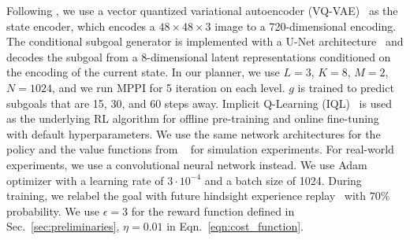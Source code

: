 Following \cite{Khazatsky2021WhatCI}, we use a vector quantized variational autoencoder (VQ-VAE)~\cite{Oord2017NeuralDR} as the state encoder, which encodes a $48 \times 48 \times 3$ image to a 720-dimensional encoding. The conditional subgoal generator is implemented with a U-Net architecture~\cite{Ronneberger2015UNetCN} and decodes the subgoal from a 8-dimensional latent representations conditioned on the encoding of the current state. In our planner, we use $L = 3$, $K = 8$, $M = 2$, $N = 1024$, and we run MPPI for 5 iteration on each level. $g$ is trained to predict subgoals that are 15, 30, and 60 steps away. Implicit Q-Learning (IQL)~\cite{kostrikov2021iql} is used as the underlying RL algorithm for offline pre-training and online fine-tuning with default hyperparameters. We use the same network architectures for the policy and the value functions from ~\cite{Khazatsky2021WhatCI} for simulation experiments. For real-world experiments, we use a convolutional neural network instead. We use Adam optimizer with a learning rate of $3 \cdot 10^{-4}$ and a batch size of 1024. During training, we relabel the goal with future hindsight experience replay~\cite{Andrychowicz2017HindsightER} with $70\%$ probability. We use $\epsilon=3$ for the reward function defined in Sec.~\ref{sec:preliminaries}, $\eta = 0.01$ in Eqn.~\ref{eqn:cost_function}. 


